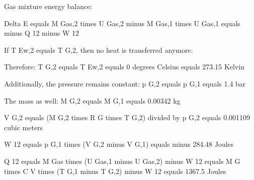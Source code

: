 Gas mixture energy balance:

Delta E equals M Gas,2 times U Gas,2 minus M Gas,1 times U Gas,1 equals minus Q 12 minus W 12

If T Ew,2 equals T G,2, then no heat is transferred anymore.

Therefore: T G,2 equals T Ew,2 equals 0 degrees Celsius equals 273.15 Kelvin

Additionally, the pressure remains constant: p G,2 equals p G,1 equals 1.4 bar

The mass as well: M G,2 equals M G,1 equals 0.00342 kg

V G,2 equals (M G,2 times R G times T G,2) divided by p G,2 equals 0.001109 cubic meters

W 12 equals p G,1 times (V G,2 minus V G,1) equals minus 284.48 Joules

Q 12 equals M Gas times (U Gas,1 minus U Gas,2) minus W 12 equals M G times C V times (T G,1 minus T G,2) minus W 12 equals 1367.5 Joules
